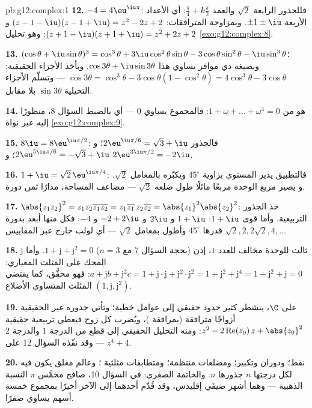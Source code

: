 \begin{solution}{pb:g12:complex:1}
\textbf{12.} $-4 = 4\eu^{\iu\pi}$: فللجذور الرابعة
 $\sqrt2$ والعمد
$\frac{\pi}{4} + k\frac{\pi}{2}$: أي الأعداد الأربعة
$\pm 1 \pm \iu$. وبمزاوجة المترافقات:
$(z - 1 - \iu)(z - 1 + \iu) = z^2 - 2z + 2$ و
$(z + 1 - \iu)(z + 1 + \iu) = z^2 + 2z + 2$: وهو
تحليل \cref{exo:g12:complex:8}.

\textbf{13.} $(\cos\theta + \iu\sin\theta)^3 = \cos^3\theta +
3\iu\cos^2\theta\sin\theta - 3\cos\theta\sin^2\theta -
\iu\sin^3\theta$؛ وبصيغة دي موافر يساوي هذا
$\cos 3\theta + \iu \sin 3\theta$. وبأخذ الأجزاء الحقيقية:
$\cos 3\theta = \cos^3\theta - 3\cos\theta(1 - \cos^2\theta)
= 4\cos^3\theta - 3\cos\theta$ --- وتسلّم الأجزاء التخيلية
$\sin 3\theta$ بلا مقابل.

\textbf{14.} هو  من
$1 + \omega + \dots + \omega^4 = 0$: فالمجموع يساوي $0$ ---
أي بالضبط السؤال 8، منظورًا إليه عبر نواة
\cref{exo:g12:complex:9}.

\textbf{15.} $8\iu = 8\eu^{\iu\pi/2}$: فالجذور
$2\eu^{\iu\pi/6} = \sqrt3 + \iu$؛
و $2\eu^{5\iu\pi/6} = -\sqrt3 + \iu$؛
و $2\eu^{3\iu\pi/2} = -2\iu$.

\textbf{16.} $1 + \iu = \sqrt2\,\eu^{\iu\pi/4}$: فالتطبيق
يدير المستوي بزاوية $45^\circ$ ويكبّره بالمعامل $\sqrt2$. و
يصير مربع الوحدة مربعًا مائلًا طول ضلعه $\sqrt2$ ---
مضاعف المساحة، مدارًا ثمن دورة.

\textbf{17.} $\abs{z_1 z_2}^2 = z_1 z_2 \overline{z_1 z_2} =
z_1\overline{z_1}\, z_2\overline{z_2} =
\abs{z_1}^2\abs{z_2}^2$: خذ الجذور التربيعية. وأما قوى
$1 + \iu$: $1 + \iu$ و $2\iu$ و $-2 + 2\iu$ و $-4$: فكل منها
أبعد بدورة قدرها $45^\circ$ وأطول بمعامل $\sqrt2$ --- أي لولب
خارج عبر المقاييس
$\sqrt2, 2, 2\sqrt2, 4, \dots$

\textbf{18.} $\mathrm{j}$  ثالث للوحدة
مخالف للعدد $1$، إذن (بحجة السؤال 7 مع $n = 3$)
$1 + \mathrm{j} + \mathrm{j}^2 = 0$. وأما المحك على المثلث
المعياري: $a + \mathrm{j}b + \mathrm{j}^2 c = 1 +
\mathrm{j}\cdot\mathrm{j} + \mathrm{j}^2 \cdot \mathrm{j}^2 =
1 + \mathrm{j}^2 + \mathrm{j}^4 = 1 + \mathrm{j}^2 +
\mathrm{j} = 0$: فهو محقَّق، كما يقتضي المثلث المتساوي الأضلاع
$\left(1, \mathrm{j}, \mathrm{j}^2\right)$.

\textbf{19.} على $\C$، ينشطر كثير حدود حقيقي إلى عوامل
خطية؛ وتأتي جذوره غير الحقيقية أزواجًا مترافقة (بمرافقة
)، ويُضرب كل زوج فيعطي تربيعية حقيقية
$z^2 - 2\operatorname{Re}(z_0)\,z + \abs{z_0}^2$: ومنه التحليل
الحقيقي إلى قطع من الدرجة $1$ والدرجة $2$ ---
وقد نفّذه السؤال 12 على $z^4 + 4$.

\textbf{20.} نقط؛ ودوران وتكبير؛ ومضلعات منتظمة؛
ومتطابقات مثلثية ؛ وعالم مغلق
يكون فيه لكل  درجتها $n$ جذورها $n$. والخاتمة الصغرى:
في السؤال 10، صافح مخمَّس $\pi$ النسبة
الذهبية --- وهما أشهر ضيفَي إقليدس، وقد قُدّم أحدهما إلى الآخر أخيرًا
بمجموع خمسة أسهم يساوي صفرًا.
\end{solution}
